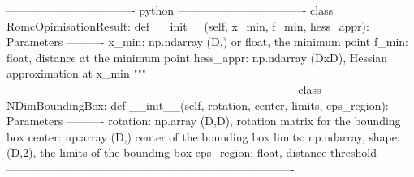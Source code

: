 \begin{Code}
---------------------------------- python ----------------------------------
class RomcOpimisationResult:
    def __init__(self, x_min, f_min, hess_appr):
        Parameters
        ----------
        x_min: np.ndarray (D,) or float, the minimum point
        f_min: float, distance at the minimum point
        hess_appr: np.ndarray (DxD), Hessian approximation at x_min
        """
----------------------------------------------------------------------------    
class NDimBoundingBox:
    def __init__(self, rotation, center, limits, eps_region):
        Parameters
        ----------
        rotation: np.array (D,D),  rotation matrix for the bounding box
        center: np.array (D,) center of the bounding box
        limits: np.ndarray, shape: (D,2), the limits of the bounding box
        eps_region: float, distance threshold 
----------------------------------------------------------------------------    
\end{Code}




